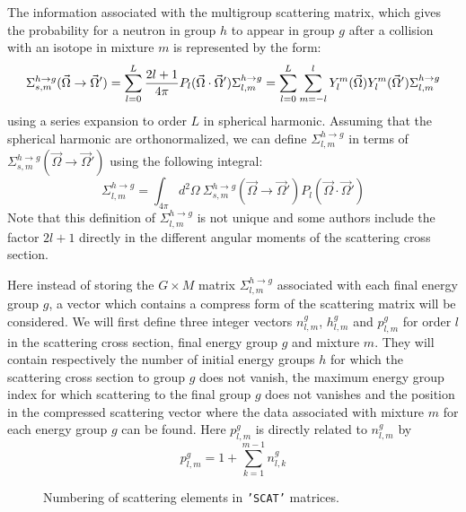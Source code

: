 The information associated with the multigroup scattering matrix, which gives the probability for a
neutron in group $h$ to appear in group $g$ after a collision with an isotope in mixture $m$
is represented by the form:
  \begin{displaymath}
    \Sigma_{s,m}^{h\to g}(\vec{\Omega}\to\vec{\Omega}')
      =\sum_{l=0}^{L}{{2l+1}\over{4\pi}} P_{l}(\vec{\Omega}\cdot\vec{\Omega}')
    \Sigma_{l,m}^{h\to g}
      =\sum_{l=0}^{L}\sum_{m=-l}^{l}
    Y_{l}^{m}(\vec{\Omega})Y_{l}^{m}(\vec{\Omega}')\Sigma_{l,m}^{h\to g}
  \end{displaymath}
using a series expansion to order $L$ in spherical harmonic. Assuming that the 
spherical harmonic are orthonormalized, 
we can define $\Sigma_{l,m}^{h\to g}$ in terms of $\Sigma_{s,m}^{h\to
g}(\vec{\Omega}\to\vec{\Omega}')$ using the following integral:
  \begin{displaymath}
    \Sigma_{l,m}^{h\to g}
      =\int_{4\pi}d^{2}\Omega \ \Sigma_{s,m}^{h\to g}(\vec{\Omega}\to\vec{\Omega}')
     P_{l}(\vec{\Omega}\cdot\vec{\Omega}')
  \end{displaymath}
Note that this definition of $\Sigma_{l,m}^{h\to g}$ is not unique and some authors
include the factor $2l+1$ directly in the different angular moments of the 
scattering cross section.

\vskip 0.2cm

Here instead of storing the $G\times M$
matrix $\Sigma_{l,m}^{h\to g}$ associated with each final energy group $g$, a vector which
contains a compress form of the scattering  matrix will be considered. 
We will first define three integer vectors $n_{l,m}^{g}$,
$h_{l,m}^{g}$ and $p_{l,m}^{g}$ for order $l$ in the scattering cross section,
final energy group $g$ and mixture $m$. They will contain respectively the number of
initial energy groups $h$ for which the scattering cross section to group $g$ does not vanish, the
maximum energy group index for which scattering to the final group $g$ does not vanishes and the
position in the compressed scattering vector where the data associated with mixture $m$ for each
energy group $g$ can be found. Here $p_{l,m}^{g}$ is directly related to $n_{l,m}^{g}$ by
  \begin{displaymath}
    p_{l,m}^{g}=1+\sum_{k=1}^{m-1} n_{l,k}^{g}
  \end{displaymath}

\begin{figure}[htbp] 
\begin{center} 
\epsfxsize=8cm
\centerline{ }
\parbox{14cm}{\caption{Numbering of scattering elements in {\tt 'SCAT'} matrices.}\label{fig:scat}} 
\end{center} 
\end{figure}

